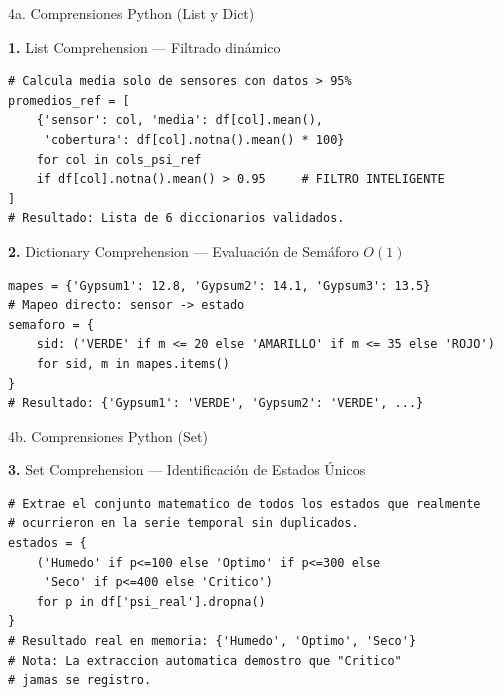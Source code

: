 \documentclass[11pt, aspectratio=169]{beamer}
\begin{document}
\begin{frame}[fragile]{4a. Comprensiones Python (List y Dict)}
\begin{exampleblock}{\textbf{1.} List Comprehension --- Filtrado dinámico}
\begin{lstlisting}[numbers=none,frame=none,basicstyle=\ttfamily\small]
# Calcula media solo de sensores con datos > 95%
promedios_ref = [
    {'sensor': col, 'media': df[col].mean(), 
     'cobertura': df[col].notna().mean() * 100}
    for col in cols_psi_ref
    if df[col].notna().mean() > 0.95     # FILTRO INTELIGENTE
]  
# Resultado: Lista de 6 diccionarios validados.
\end{lstlisting}
\end{exampleblock}

\vfill
\begin{block}{\textbf{2.} Dictionary Comprehension --- Evaluación de Semáforo $O(1)$}
\begin{lstlisting}[numbers=none,frame=none,basicstyle=\ttfamily\small]
mapes = {'Gypsum1': 12.8, 'Gypsum2': 14.1, 'Gypsum3': 13.5}
# Mapeo directo: sensor -> estado
semaforo = {
    sid: ('VERDE' if m <= 20 else 'AMARILLO' if m <= 35 else 'ROJO')
    for sid, m in mapes.items()
}
# Resultado: {'Gypsum1': 'VERDE', 'Gypsum2': 'VERDE', ...}
\end{lstlisting}
\end{block}
\end{frame}

\begin{frame}[fragile]{4b. Comprensiones Python (Set)}
\begin{alertblock}{\textbf{3.} Set Comprehension --- Identificación de Estados Únicos}
\begin{lstlisting}[numbers=none,frame=none,basicstyle=\ttfamily\small]
# Extrae el conjunto matematico de todos los estados que realmente 
# ocurrieron en la serie temporal sin duplicados.
estados = {
    ('Humedo' if p<=100 else 'Optimo' if p<=300 else 
     'Seco' if p<=400 else 'Critico')
    for p in df['psi_real'].dropna()
}
# Resultado real en memoria: {'Humedo', 'Optimo', 'Seco'}
# Nota: La extraccion automatica demostro que "Critico" 
# jamas se registro.
\end{lstlisting}
\end{alertblock}
\end{frame}
\end{document}
